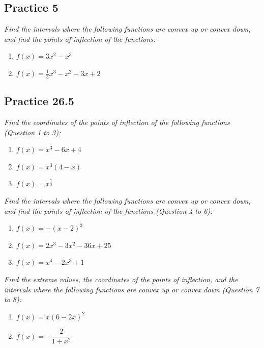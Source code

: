 \documentclass{report}
\begin{document}
\subsection{Practice 5}

\noindent \hspace{1.2em}\textit{Find the intervals where the following functions are convex up or convex down, and find the points of inflection of the functions:}
\begin{enumerate}
    \item $f(x)=3 x^2-x^3$
    \item $f(x)=\frac{1}{3} x^3-x^2-3 x+2$
\end{enumerate}

\subsection{Practice 26.5}
\noindent \hspace{1.2em}\textit{Find the coordinates of the points of inflection of the following functions (Question 1 to 3):}
\begin{enumerate}
    \item $f(x)=x^3-6 x+4$
    \item $f(x)=x^3(4-x)$
    \item $f(x)=x^{\frac{7}{3}}$
\end{enumerate}

\noindent \hspace{1.2em}\parbox{\textwidth-1.2em}{\textit{Find the intervals where the following functions
        are convex up or convex down, and find the points of inflection of the
        functions (Question 4 to 6):}}
\begin{enumerate}[resume]
    \item $f(x)=-(x-2)^3$
    \item $f(x)=2 x^3-3 x^2-36 x+25$
    \item $f(x)=x^4-2 x^3+1$
\end{enumerate}

\noindent \hspace{1.2em}\parbox{\textwidth-1.2em}{\textit{Find the extreme values, the coordinates of the
        points of inflection, and the intervals where the following functions are
        convex up or convex down (Question 7 to 8):}}
\begin{enumerate}[resume]
    \item $f(x)=x(6-2 x)^2$
    \item $f(x)=-\dfrac{2}{1+x^2}$
\end{enumerate}
\end{document}
